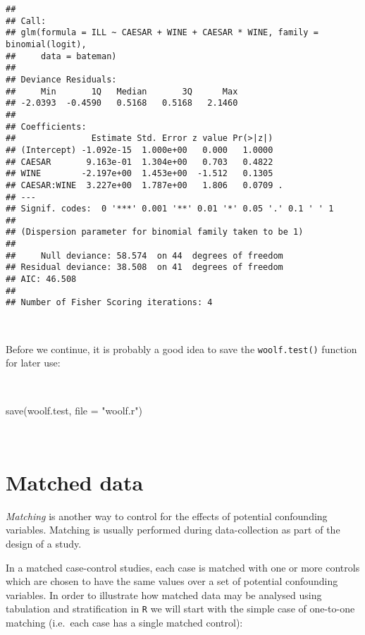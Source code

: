 \documentclass[
  12pt,
  a4paper]{book}
\newenvironment{Shaded}{\begin{snugshade}}{\end{snugshade}}
\newcommand{\AttributeTok}[1]{\textcolor[rgb]{0.77,0.63,0.00}{#1}}
\newcommand{\FunctionTok}[1]{\textcolor[rgb]{0.00,0.00,0.00}{#1}}
\newcommand{\NormalTok}[1]{#1}
\newcommand{\StringTok}[1]{\textcolor[rgb]{0.31,0.60,0.02}{#1}}
\begin{document}
\begin{verbatim}
## 
## Call:
## glm(formula = ILL ~ CAESAR + WINE + CAESAR * WINE, family = binomial(logit), 
##     data = bateman)
## 
## Deviance Residuals: 
##     Min       1Q   Median       3Q      Max  
## -2.0393  -0.4590   0.5168   0.5168   2.1460  
## 
## Coefficients:
##               Estimate Std. Error z value Pr(>|z|)  
## (Intercept) -1.092e-15  1.000e+00   0.000   1.0000  
## CAESAR       9.163e-01  1.304e+00   0.703   0.4822  
## WINE        -2.197e+00  1.453e+00  -1.512   0.1305  
## CAESAR:WINE  3.227e+00  1.787e+00   1.806   0.0709 .
## ---
## Signif. codes:  0 '***' 0.001 '**' 0.01 '*' 0.05 '.' 0.1 ' ' 1
## 
## (Dispersion parameter for binomial family taken to be 1)
## 
##     Null deviance: 58.574  on 44  degrees of freedom
## Residual deviance: 38.508  on 41  degrees of freedom
## AIC: 46.508
## 
## Number of Fisher Scoring iterations: 4
\end{verbatim}

~

Before we continue, it is probably a good idea to save the \texttt{woolf.test()} function for later use:

~

\begin{Shaded}
\begin{Highlighting}[]
\FunctionTok{save}\NormalTok{(woolf.test, }\AttributeTok{file =} \StringTok{"woolf.r"}\NormalTok{)}
\end{Highlighting}
\end{Shaded}

~

\hypertarget{matched-data}{%
\section{Matched data}\label{matched-data}}

\emph{Matching} is another way to control for the effects of potential confounding variables. Matching is usually performed during data-collection as part of the design of a study.

In a matched case-control studies, each case is matched with one or more controls which are chosen to have the same values over a set of potential confounding variables.
In order to illustrate how matched data may be analysed using tabulation and stratification in \texttt{R} we will start with the simple case of one-to-one matching (i.e.~each case has a single matched control):

~
\end{document}
